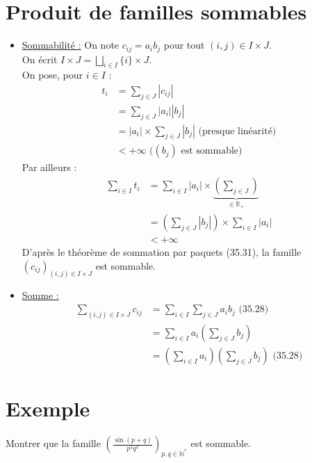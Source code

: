\documentclass[../main.tex]{subfiles}
\begin{document}
\section{Produit de familles sommables}
\begin{itemize}
    \item \underline{Sommabilité :} On note $c_{ij} = a_i b_j$ pour tout $(i, j)\in I\times J$. \\
    On écrit $I\times J = \bigsqcup\limits_{i\in I} \{i\}\times J$. \\
    On pose, pour $i\in I$ : 
    \begin{align*}
        t_i &= \sum_{j\in J} |c_{ij}| \\
        &= \sum_{j\in J} |a_i||b_j| \\
        &= |a_i| \times \sum_{j\in J} |b_j| \text{ (presque linéarité)} \\
        &< +\infty \text{ ($(b_j)$ est sommable)}
    \end{align*}
    Par ailleurs : 
    \begin{align*}
        \sum_{i\in I} t_i &= \sum_{i\in I} |a_i| \times \underbrace{\left( \sum_{j\in J} \right)}_{\in \mathbb{R}_+} \\
        &= \left( \sum_{j\in J} |b_j| \right) \times \sum_{i\in I} |a_i| \\
        &< +\infty
    \end{align*}
    D'après le théorème de sommation par paquets (35.31), la famille $(c_{ij})_{(i, j)\in I\times J}$ est sommable. 

    \item \underline{Somme :}
    \begin{align*}
        \sum_{(i, j)\in I\times J} c_{ij} &= \sum_{i\in I} \sum_{j\in J} a_i b_j \text{ (35.28)} \\
        &= \sum_{i\in I} a_i \left( \sum_{j\in J} b_j \right) \\
        &= \left( \sum_{i\in I} a_i \right) \left( \sum_{j\in J} b_j \right) \text{ (35.28)}
    \end{align*}
\end{itemize}

\section{Exemple}
\begin{tcolorbox}[title=Exemple 35.34, title filled=false, colframe=darkgreen, colback=darkgreen!10!white]
    Montrer que la famille $\left( \frac{\sin (p+q)}{p^2q^2} \right)_{p, q\in \mathbb{N}^*}$ est sommable. 
\end{tcolorbox}
\end{document}
